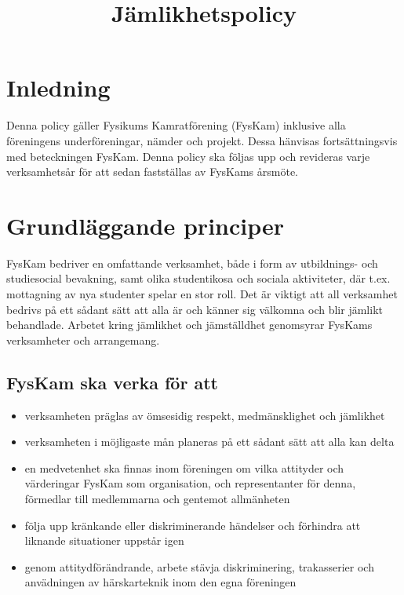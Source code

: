 \documentclass{../resources/dgovdoc}
\title{Jämlikhetspolicy}
\begin{document}
\maketitle

\section{Inledning}

Denna policy gäller Fysikums Kamratförening (FysKam) inklusive alla
föreningens underföreningar, nämder och projekt. Dessa hänvisas fortsättningsvis
med beteckningen FysKam. Denna policy ska följas upp och revideras
varje verksamhetsår för att sedan fastställas av FysKams årsmöte.

\section{Grundläggande principer}

FysKam bedriver en omfattande verksamhet, både i form av
utbildnings- och studiesocial bevakning, samt olika studentikosa och sociala aktiviteter,
där t.ex. mottagning av nya studenter spelar en stor roll. Det är viktigt att all
verksamhet bedrivs på ett sådant sätt att alla är och känner sig välkomna och blir
jämlikt behandlade. Arbetet kring jämlikhet och jämställdhet genomsyrar FysKams
verksamheter och arrangemang.

\subsection{FysKam ska verka för att}

\begin{itemize}
\item verksamheten präglas av ömsesidig respekt, medmänsklighet och jämlikhet
\item verksamheten i möjligaste mån planeras på ett sådant sätt att alla kan delta
\item en medvetenhet ska finnas inom föreningen om vilka attityder och
värderingar FysKam som organisation, och representanter för denna, förmedlar till
medlemmarna och gentemot allmänheten
\item följa upp kränkande eller diskriminerande händelser och förhindra att liknande
situationer uppstår igen
\item genom attitydförändrande, arbete stävja diskriminering, trakasserier och
anvädningen av härskarteknik inom den egna föreningen
\end{itemize}
\end{document}
